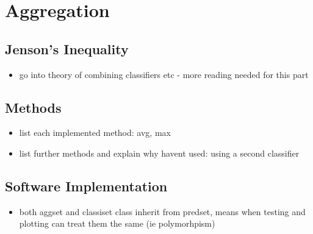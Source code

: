 \section{Aggregation}
\label{sec:pl-agg}
    
    \subsection{Jenson's Inequality}
    \label{subsec:pl-agg-jenson}
        \begin{itemize}
            \item{go into theory of combining classifiers etc - more reading needed for this part}
        \end{itemize}
    
    \subsection{Methods}
    \label{subsec:pl-agg-methods}
        \begin{itemize}
            \item{list each implemented method: avg, max}
            \item{list further methods and explain why havent used: using a second classifier}
        \end{itemize}
        
    \subsection{Software Implementation}
    \label{subsec:pl-agg-software}
        \begin{itemize}
            \item{both aggset and classiset class inherit from predset, means when testing and plotting can treat them the same (ie polymorhpism)}
        \end{itemize}